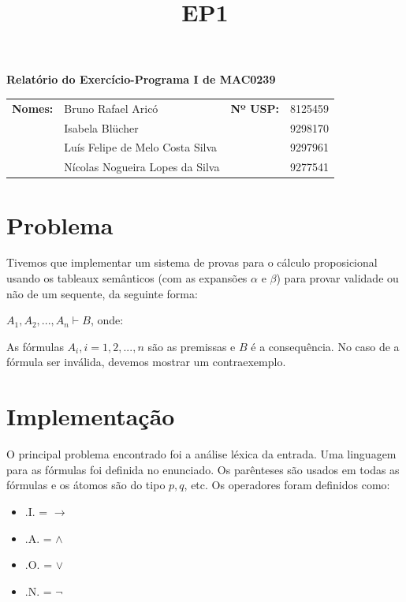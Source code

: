 \documentclass[12pt,letterpaper]{article}
\title{EP1}
\begin{document}
	
\begin{center}
	\large \bf
	Relatório do Exercício-Programa I de MAC0239 \\
\end{center}
	
\begin{table}[]
	\centering
	\label{my-label}
	\begin{tabular}{llll}
		\textbf{Nomes:} & Bruno Rafael Aricó        &\textbf{Nº USP:} & 8125459 \\
		& Isabela Blücher                 &         & 9298170 \\
		& Luís Felipe de Melo Costa Silva &         & 9297961 \\
		& Nícolas Nogueira Lopes da Silva &         & 9277541 \\
	\end{tabular}
\end{table}

\section{Problema}

\quad Tivemos que implementar um sistema de provas para o cálculo proposicional usando os tableaux semânticos (com as expansões $\alpha$ e $\beta$) para provar validade ou não de um sequente, da seguinte forma: 
\begin{center}
	$A_1, A_2, ..., A_n \vdash B$, onde:
\end{center}
As fórmulas $A_i, i = 1, 2, ..., n$ são as premissas e $B$ é a consequência. No caso de a fórmula ser inválida, devemos mostrar um contraexemplo.

\section{Implementação}

\quad O principal problema encontrado foi a análise léxica da entrada. Uma linguagem para as fórmulas foi definida no enunciado. Os parênteses são usados em todas as fórmulas e os átomos são do tipo $p, q$, etc. Os operadores foram definidos como:
	
\begin{itemize}
	\item .I. = $\to$ 
	\item .A. = $\land$
	\item .O. = $\lor$
	\item .N. = $\lnot$
\end{itemize}
\end{document}
